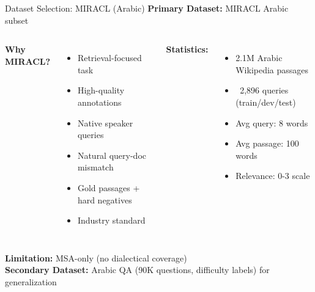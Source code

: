 \documentclass[aspectratio=169]{beamer}
\begin{document}
\begin{frame}{Dataset Selection: MIRACL (Arabic)}
\textbf{Primary Dataset:} MIRACL Arabic subset

\vspace{0.3cm}

\begin{columns}
\textbf{Why MIRACL?}
\begin{itemize}
    \item Retrieval-focused task
    \item High-quality annotations
    \item Native speaker queries
    \item Natural query-doc mismatch
    \item Gold passages + hard negatives
    \item Industry standard
\end{itemize}

\textbf{Statistics:}
\begin{itemize}
    \item 2.1M Arabic Wikipedia passages
    \item ~2,896 queries (train/dev/test)
    \item Avg query: 8 words
    \item Avg passage: 100 words
    \item Relevance: 0-3 scale
\end{itemize}
\end{columns}

\vspace{0.5cm}

\textbf{Limitation:} MSA-only (no dialectical coverage)\\
\textbf{Secondary Dataset:} Arabic QA (90K questions, difficulty labels) for generalization
\end{frame}
\end{document}
